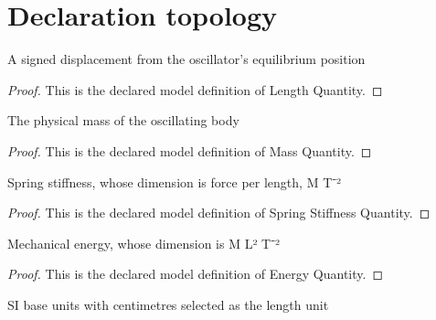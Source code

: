 \section{Declaration topology}
\begin{definition}
  \label{def:physics:phyx-mini-0259:phyxminiproblems-problemphyxmini0259-lengthquantity}
  A signed displacement from the oscillator's equilibrium position
\end{definition}
\begin{proof}
  This is the declared model definition of Length Quantity.
\end{proof}
\begin{definition}
  \label{def:physics:phyx-mini-0259:phyxminiproblems-problemphyxmini0259-massquantity}
  The physical mass of the oscillating body
\end{definition}
\begin{proof}
  This is the declared model definition of Mass Quantity.
\end{proof}
\begin{definition}
  \label{def:physics:phyx-mini-0259:phyxminiproblems-problemphyxmini0259-springstiffnessquantity}
  Spring stiffness, whose dimension is force per length, M T⁻²
\end{definition}
\begin{proof}
  This is the declared model definition of Spring Stiffness Quantity.
\end{proof}
\begin{definition}
  \label{def:physics:phyx-mini-0259:phyxminiproblems-problemphyxmini0259-energyquantity}
  Mechanical energy, whose dimension is M L² T⁻²
\end{definition}
\begin{proof}
  This is the declared model definition of Energy Quantity.
\end{proof}
\begin{definition}
  \label{def:physics:phyx-mini-0259:phyxminiproblems-problemphyxmini0259-centimeterunitchoices}
  SI base units with centimetres selected as the length unit
\end{definition}

